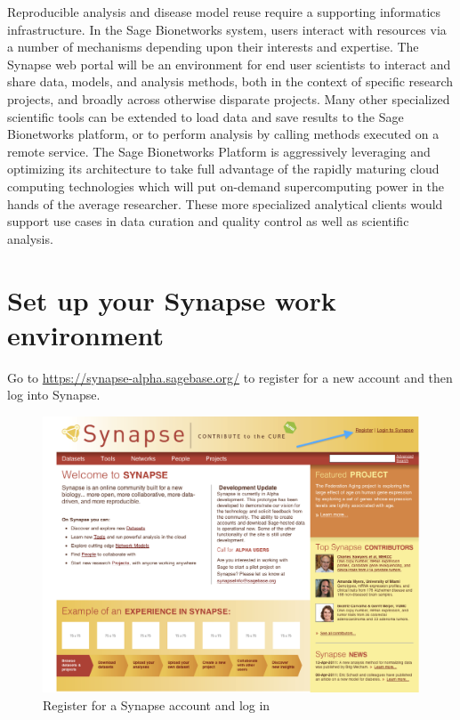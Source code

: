\documentclass[10pt]{article}
\begin{document}
Reproducible analysis and disease model reuse require a supporting
informatics infrastructure. In the Sage Bionetworks system, users interact
with resources via a number of mechanisms depending upon their interests and
expertise. The Synapse web portal will be an environment for end user
scientists to interact and share data, models, and analysis methods, both in
the context of specific research projects, and broadly across otherwise
disparate projects. Many other specialized scientific tools can be extended
to load data and save results to the Sage Bionetworks platform, or to
perform analysis by calling methods executed on a remote service. The Sage
Bionetworks Platform is aggressively leveraging and optimizing its
architecture to take full advantage of the rapidly maturing cloud computing
technologies which will put on-demand supercomputing power in the hands of
the average researcher.  These more specialized analytical clients would
support use cases in data curation and quality control as well as scientific
analysis.

\section{Set up your Synapse work environment}

Go to \url{https://synapse-alpha.sagebase.org/} to register for a new
account and then log into Synapse.

\begin{figure}[H]
  \centering
  \includegraphics{synapseScreenshots/Register.png}
  \caption{Register for a Synapse account and log in}
\end{figure}
\end{document}
